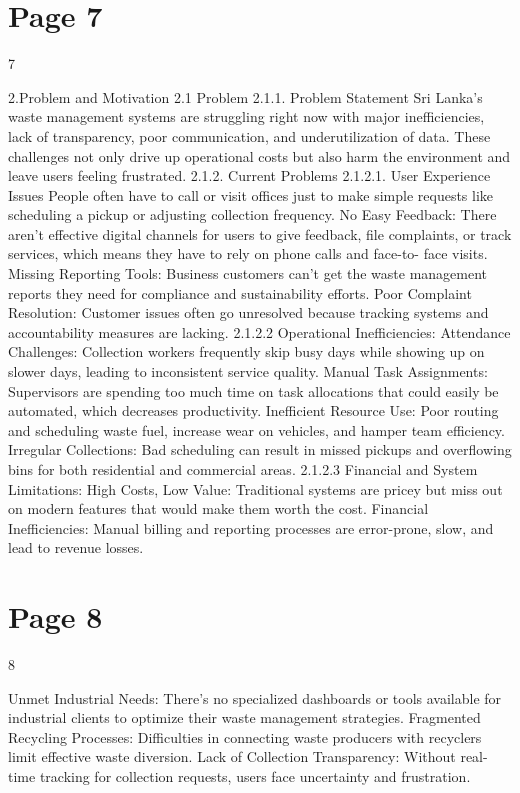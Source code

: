 \documentclass{article}
\begin{document}
 
 
 

\section*{Page 7}
   
 
 7  
 
2.Problem and Motivation 
2.1 Problem 
2.1.1. Problem Statement 
Sri Lanka's waste management systems are struggling right now with major 
inefficiencies, lack of transparency, poor communication, and underutilization of data. 
These challenges not only drive up operational costs but also harm the environment and 
leave users feeling frustrated. 
2.1.2. Current Problems 
    2.1.2.1. User Experience Issues 
People often have to call or visit offices just to make simple requests like scheduling a 
pickup or adjusting collection frequency. 
No Easy Feedback: There aren’t effective digital channels for users to give feedback, file 
complaints, or track services, which means they have to rely on phone calls and face-to-
face visits. 
Missing Reporting Tools: Business customers can’t get the waste management reports 
they need for compliance and sustainability efforts. 
Poor Complaint Resolution: Customer issues often go unresolved because tracking 
systems and accountability measures are lacking. 
    2.1.2.2 Operational Inefficiencies: 
Attendance Challenges: Collection workers frequently skip busy days while showing up 
on slower days, leading to inconsistent service quality. 
Manual Task Assignments: Supervisors are spending too much time on task allocations 
that could easily be automated, which decreases productivity. 
Inefficient Resource Use: Poor routing and scheduling waste fuel, increase wear on 
vehicles, and hamper team efficiency. 
Irregular Collections: Bad scheduling can result in missed pickups and overflowing bins 
for both residential and commercial areas.    
    2.1.2.3 Financial and System Limitations: 
High Costs, Low Value: Traditional systems are pricey but miss out on modern features 
that would make them worth the cost. 
Financial Inefficiencies: Manual billing and reporting processes are error-prone, slow, 
and lead to revenue losses. 

\section*{Page 8}
   
 
 8  
 
Unmet Industrial Needs: There's no specialized dashboards or tools available for 
industrial clients to optimize their waste management strategies. 
Fragmented Recycling Processes: Difficulties in connecting waste producers with 
recyclers limit effective waste diversion. 
Lack of Collection Transparency: Without real-time tracking for collection requests, 
users face uncertainty and frustration. 
 
\end{document}
